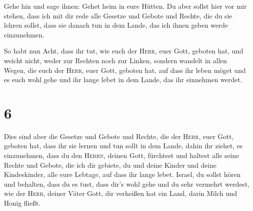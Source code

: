  Gehe hin und sage ihnen: Gehet heim in eure Hütten.
 Du aber sollst hier vor mir stehen, dass ich mit dir
rede alle Gesetze und Gebote und Rechte, die du sie lehren sollst, dass
sie danach tun in dem Lande, das ich ihnen geben werde einzunehmen.

 So habt nun Acht, dass ihr tut, wie euch der
\textsc{Herr}, euer Gott, geboten hat, und weicht nicht, weder zur
Rechten noch zur Linken,  sondern wandelt in allen Wegen,
die euch der \textsc{Herr}, euer Gott, geboten hat, auf dass ihr leben
möget und es euch wohl gehe und ihr lange lebet in dem Lande, das ihr
einnehmen werdet.

\hypertarget{section-5}{%
\section{6}\label{section-5}}

 Dies sind aber die Gesetze und Gebote und Rechte, die der
\textsc{Herr}, euer Gott, geboten hat, dass ihr sie lernen und tun sollt
in dem Lande, dahin ihr ziehet, es einzunehmen,  dass du
den \textsc{Herrn}, deinen Gott, fürchtest und haltest alle seine Rechte
und Gebote, die ich dir gebiete, du und deine Kinder und deine
Kindeskinder, alle eure Lebtage, auf dass ihr lange lebet.
 Israel, du sollst hören und behalten, dass du es tust,
dass dir's wohl gehe und du sehr vermehrt werdest, wie der
\textsc{Herr}, deiner Väter Gott, dir verheißen hat ein Land, darin
Milch und Honig fließt.

